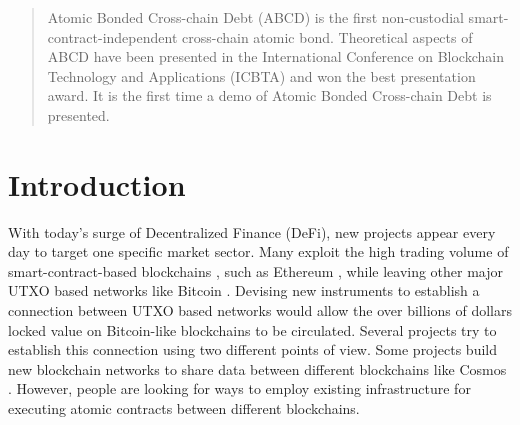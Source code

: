 \documentclass[conference,compsoc]{IEEEtran}
\begin{document}

\newcommand{\ie}{{i.e.}}
\newcommand{\eg}{{e.g.}}
\newcommand{\etal}{et al.}
\newcommand{\Ie}{{I.e.}}
\newcommand{\Eg}{{E.g.}}


\IEEEoverridecommandlockouts
{}

\maketitle
\begingroup\renewcommand\thefootnote{\textsection}
\endgroup
\begin{abstract}
Atomic Bonded Cross-chain Debt (ABCD) is the first non-custodial smart-contract-independent cross-chain atomic bond. Theoretical aspects of ABCD have been presented in the International Conference on Blockchain Technology and Applications (ICBTA) and won the best presentation award. It is the first time a demo of Atomic Bonded Cross-chain Debt is presented. 
\end{abstract}





%
\IEEEpeerreviewmaketitle



\section{Introduction}
\vspace{-0.1em}
With today's surge of Decentralized Finance (DeFi), new projects appear every day to target one specific market sector. Many exploit the high trading volume of smart-contract-based blockchains \cite{adams2020uniswap, aave, maker, compound}, such as Ethereum \cite{buterin2014next}, while leaving other major UTXO based networks like Bitcoin \cite{nakamoto2019bitcoin}. Devising new instruments to establish a connection between UTXO based networks would allow the over billions of dollars locked value on Bitcoin-like blockchains to be circulated.
Several projects try to establish this connection using two different points of view. Some projects build new blockchain networks to share data between different blockchains like Cosmos \cite{kwon2018network}. However, people are looking for ways to employ existing infrastructure for executing atomic contracts between different blockchains.
\end{document}
